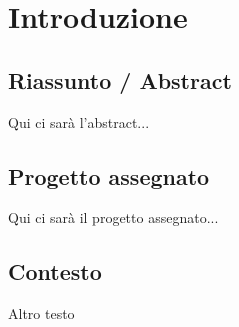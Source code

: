 \chapter{Introduzione}

\section{Riassunto / Abstract}

Qui ci sarà l'abstract...

\section{Progetto assegnato}

Qui ci sarà il progetto assegnato...

\section{Contesto}

Altro testo
